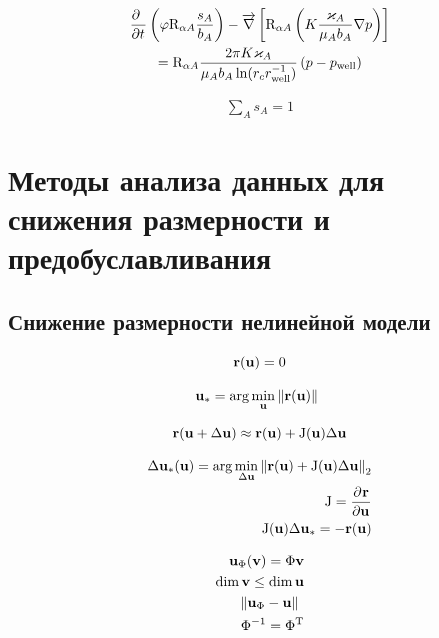 \subsection{}

\begin{multline}
    \deriv{~}{t}\left(
        \varphi \matr{R}_{\alpha A} \frac{s_A}{b_A}
    \right) - \overrightarrow{\nabla} \left[
        \matr{R}_{\alpha A} \left(
            K\frac{\varkappa_A}{\mu_A b_A}\nabla p
        \right)
    \right] \\
    = \matr{R}_{\alpha A}
    \frac{2\pi K \varkappa_A}{\mu_A b_A \ln(r_c r_\text{well}^{-1})}
    \left(p - p_\text{well}\right)
\end{multline}

\begin{align}
    \sum_A s_A = 1
\end{align}

\section{Методы анализа данных для снижения размерности и предобуславливания}

\subsection{Снижение размерности нелинейной модели}

\begin{equation}
   \resid(\unk) = 0
\end{equation}

\begin{equation}
    \unk_\ast = \arg \min_{\unk} \norm{\resid(\unk)}
\end{equation}

\begin{equation}
    \resid(\unk + \Delta \unk) \approx \resid(\unk) + \jac(\unk) \dunk
\end{equation}

\begin{align}
    \dunk_\ast (\unk) = \arg \min_{\dunk} \norm[2]{\resid(\unk) + \jac(\unk) \dunk} \\
    \jac = \deriv{\resid}{\unk} \\
    \jac(\unk) \dunk_\ast = - \resid(\unk)
\end{align}

\begin{align}
    \unk_\Phi (\vunk) = \Phi \vunk \\
    \dim{\vunk} \leq \dim{\unk} \\
    \norm{\unk_\Phi - \unk} \\
    \Phi^{-1} = \transpose{\Phi}
\end{align}

